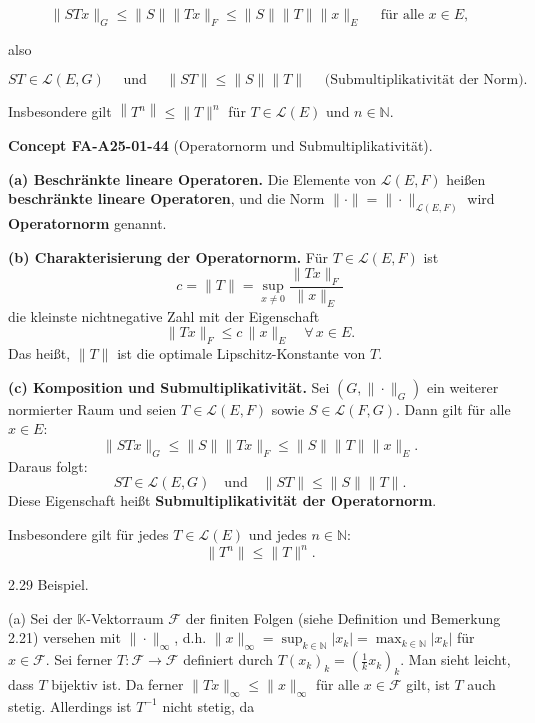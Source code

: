 \documentclass[10pt, letterpaper]{article}
\newcommand{\CustomHeading}[3]{%
  \par\medskip\noindent%
  \textbf{#1 #2} \textnormal{(#3)}.\enskip%
}
\newenvironment{CONC}[2]{\begin{unitbox}\CustomHeading{Concept}{#1}{#2}}{\end{unitbox}}
\begin{document}
$$
\|S T x\|_{G} \leq\|S\|\|T x\|_{F} \leq\|S\|\|T\|\|x\|_{E} \quad \text { für alle } x \in E,
$$

also

$$
S T \in \mathcal{L}(E, G) \quad \text { und } \quad\|S T\| \leq\|S\|\|T\| \quad \text { (Submultiplikativität der Norm). }
$$

Insbesondere gilt $\left\|T^{n}\right\| \leq\|T\|^{n}$ für $T \in \mathcal{L}(E)$ und $n \in \mathbb{N}$.



\begin{CONC}{FA-A25-01-44}{Operatornorm und Submultiplikativität}
\textbf{(a) Beschränkte lineare Operatoren.}  
Die Elemente von $\mathcal{L}(E,F)$ heißen \textbf{beschränkte lineare Operatoren},  
und die Norm $\|\cdot\|=\|\cdot\|_{\mathcal{L}(E,F)}$ wird \textbf{Operatornorm} genannt.

\textbf{(b) Charakterisierung der Operatornorm.}  
Für $T\in\mathcal{L}(E,F)$ ist
\[
c=\|T\|=\sup_{x\neq 0}\frac{\|Tx\|_F}{\|x\|_E}
\]
die kleinste nichtnegative Zahl mit der Eigenschaft
\[
\|Tx\|_F\le c\,\|x\|_E\quad\forall\,x\in E.
\]
Das heißt, $\|T\|$ ist die optimale Lipschitz-Konstante von $T$.

\textbf{(c) Komposition und Submultiplikativität.}  
Sei $(G,\|\cdot\|_G)$ ein weiterer normierter Raum und seien $T\in\mathcal{L}(E,F)$ sowie $S\in\mathcal{L}(F,G)$.  
Dann gilt für alle $x\in E$:
\[
\|STx\|_G \le \|S\|\|Tx\|_F \le \|S\|\|T\|\|x\|_E.
\]
Daraus folgt:
\[
ST \in \mathcal{L}(E,G)
\quad\text{und}\quad
\|ST\| \le \|S\|\|T\|.
\]
Diese Eigenschaft heißt \textbf{Submultiplikativität der Operatornorm}.

Insbesondere gilt für jedes $T\in\mathcal{L}(E)$ und jedes $n\in\mathbb{N}$:
\[
\|T^n\| \le \|T\|^n.
\]
\end{CONC}



2.29 Beispiel. 

(a) Sei der $\mathbb{K}$-Vektorraum $\mathcal{F}$ der finiten Folgen (siehe Definition und Bemerkung 2.21) versehen mit $\|\cdot\|_{\infty}$, d.h. $\|x\|_{\infty}=\sup _{k \in \mathbb{N}}\left|x_{k}\right|=\max _{k \in \mathbb{N}}\left|x_{k}\right|$ für $x \in \mathcal{F}$. Sei ferner $T: \mathcal{F} \rightarrow \mathcal{F}$ definiert durch $T\left(x_{k}\right)_{k}=\left(\frac{1}{k} x_{k}\right)_{k}$. Man sieht leicht, dass $T$ bijektiv ist. Da ferner $\|T x\|_{\infty} \leq\|x\|_{\infty}$ für alle $x \in \mathcal{F}$ gilt, ist $T$ auch stetig. Allerdings ist $T^{-1}$ nicht stetig, da
\end{document}
